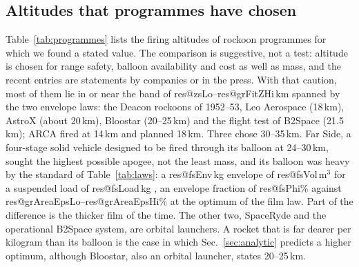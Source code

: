 \documentclass[11pt,a4paper]{article}
\makeatletter
\newcommand{\R}[1]{\csname res@#1\endcsname}
\makeatother
\begin{document}
\subsection{Altitudes that programmes have chosen}
\label{sec:programmes}

Table~\ref{tab:programmes} lists the firing altitudes of rockoon programmes for which we found a stated value. The comparison is suggestive, not a test: altitude is chosen for range safety, balloon availability and cost as well as mass, and the recent entries are statements by companies or in the press. With that caution, most of them lie in or near the band of \R{zsLo}--\R{grFitZHi}\,km spanned by the two envelope laws: the Deacon rockoons of 1952--53, Leo Aerospace (18\,km), AstroX (about 20\,km), Bloostar (20--25\,km) and the flight test of B2Space (21.5\,km); ARCA fired at 14\,km and planned 18\,km. Three chose 30--35\,km. Far Side, a four-stage solid vehicle designed to be fired through its balloon at 24--30\,km, sought the highest possible apogee, not the least mass, and its balloon was heavy by the standard of Table~\ref{tab:laws}: a \R{fsEnv}\,kg envelope of \R{fsVol}\,m$^3$ for a suspended load of \R{fsLoad}\,kg \cite{farside}, an envelope fraction of \R{fsPhi}\% against \R{grAreaEpsLo}--\R{grAreaEpsHi}\% at the optimum of the film law. Part of the difference is the thicker film of the time. The other two, SpaceRyde and the operational B2Space system, are orbital launchers. A rocket that is far dearer per kilogram than its balloon is the case in which Sec.~\ref{sec:analytic} predicts a higher optimum, although Bloostar, also an orbital launcher, states 20--25\,km.
\end{document}
